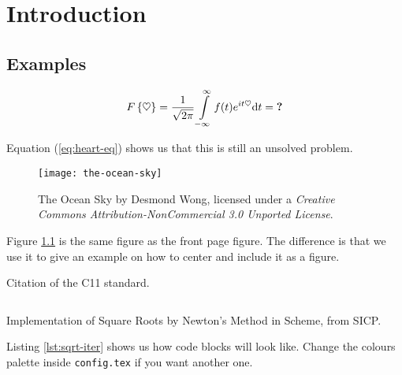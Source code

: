 
\chapter{Introduction}\label{ch:intro}

\section{Examples}

\lipsum[1-2]

\begin{equation} \label{eq:heart-eq}
  F\left\{ \heartsuit \right \} =
  \frac{1}{\sqrt{2\pi}} \int\limits_{-\infty}^{\infty} f(t) e^{i t \heartsuit} \mathrm{d} t
  = \text{\textbf{?}}
\end{equation}

Equation (\ref{eq:heart-eq}) shows us that this is still an unsolved problem.

\lipsum[3]

\begin{figure}
  \centering
  \texttt{[image: the-ocean-sky]}
  \caption{The Ocean Sky by Desmond Wong, licensed under a \emph{Creative
      Commons Attribution-NonCommercial 3.0 Unported License}.}
  \label{fig:ocean-sky}
\end{figure}

Figure \ref{fig:ocean-sky} is the same figure as the front page figure. The
difference is that we use it to give an example on how to center and include it
as a figure.

\lipsum[4]

Citation of the C11 standard\cite{iso2011c}.

\lipsum[11-12]

\begin{listing}
  \inputminted[frame=single,linenos,fontsize=\small,mathescape]{scm}{lst/sqrt-iter.scm}
  \caption{Implementation of Square Roots by Newton's Method in Scheme, from
    SICP.}
  \label{lst:sqrt-iter}
\end{listing}

Listing \ref{lst:sqrt-iter} shows us how code blocks will look like. Change the
colours palette inside \texttt{config.tex} if you want another one.

\lipsum[13]
